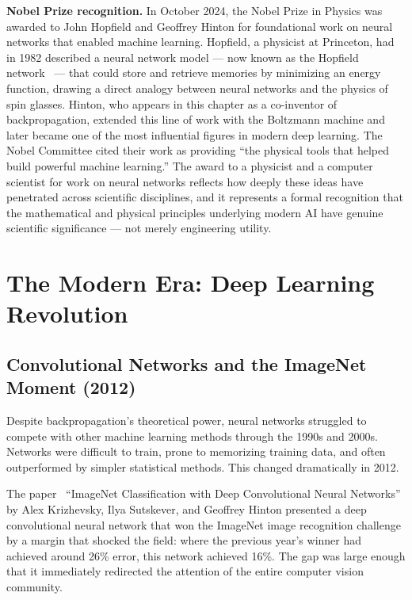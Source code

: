 \documentclass{book}
\begin{document}
\textbf{Nobel Prize recognition.} In October 2024, the Nobel Prize in Physics
was awarded to John Hopfield and Geoffrey Hinton for foundational work on
neural networks that enabled machine learning. Hopfield, a physicist at
Princeton, had in 1982 described a neural network model --- now known as the
Hopfield network~\cite{hopfield1982neural} --- that could store and retrieve
memories by minimizing an energy function, drawing a direct analogy between
neural networks and the physics of spin glasses. Hinton, who appears in this
chapter as a co-inventor of backpropagation, extended this line of work with
the Boltzmann machine and later became one of the most influential figures in
modern deep learning. The Nobel Committee cited their work as providing
``the physical tools that helped build powerful machine learning.'' The award
to a physicist and a computer scientist for work on neural networks reflects
how deeply these ideas have penetrated across scientific disciplines, and it
represents a formal recognition that the mathematical and physical principles
underlying modern AI have genuine scientific significance --- not merely
engineering utility.

\section{The Modern Era: Deep Learning Revolution}

\subsection{Convolutional Networks and the ImageNet Moment (2012)}
\label{sec:imagenet}

Despite backpropagation's theoretical power, neural networks struggled to
compete with other machine learning methods through the 1990s and 2000s.
Networks were difficult to train, prone to memorizing training data, and
often outperformed by simpler statistical methods. This changed dramatically
in 2012.

The paper~\cite{krizhevsky2012imagenet} ``ImageNet Classification with Deep
Convolutional Neural Networks'' by Alex Krizhevsky, Ilya Sutskever, and
Geoffrey Hinton presented a deep convolutional neural network that won the
ImageNet image recognition challenge by a margin that shocked the field:
where the previous year's winner had achieved around 26\% error, this
network achieved 16\%. The gap was large enough that it immediately
redirected the attention of the entire computer vision community.
\end{document}
